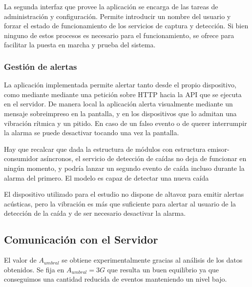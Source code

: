 La segunda interfaz que provee la aplicación se encarga de las tareas de administración y configuración. Permite introducir un nombre del usuario y forzar el estado de funcionamiento de los servicios de captura y detección. Si bien ninguno de estos procesos es necesario para el funcionamiento, se ofrece para facilitar la puesta en marcha y prueba del sistema.

\subsubsection{Gestión de alertas}

La aplicación implementada permite alertar tanto desde el propio dispositivo, como mediante mediante una petición sobre HTTP hacia la API  que se ejecuta en el servidor. De manera local la aplicación alerta visualmente mediante un mensaje sobreimpreso en la pantalla, y en los dispositivos que lo admitan una vibración rítmica y un pitido. En caso de un falso evento o de querer interrumpir la alarma se puede desactivar tocando una vez la pantalla. 

Hay que recalcar que dada la estructura de módulos con estructura emisor-consumidor asíncronos, el servicio de detección de caídas no deja de funcionar en ningún momento, y podría lanzar un segundo evento de caída incluso durante la alarma del primero. El modelo es capaz de detectar una nueva caída 

El dispositivo utilizado para el estudio no dispone de altavoz para emitir alertas acústicas, pero la vibración es más que suficiente para alertar al usuario de la detección de la caída y de ser necesario desactivar la alarma.

\subsection{Comunicación con el Servidor}




El valor de $A_{umbral}$ se obtiene experimentalmente gracias al análisis de los datos obtenidos. Se fija en $A_{umbral} = 3G$ que resulta un buen equilibrio ya que conseguimos una cantidad reducida de eventos manteniendo un nivel bajo. 

